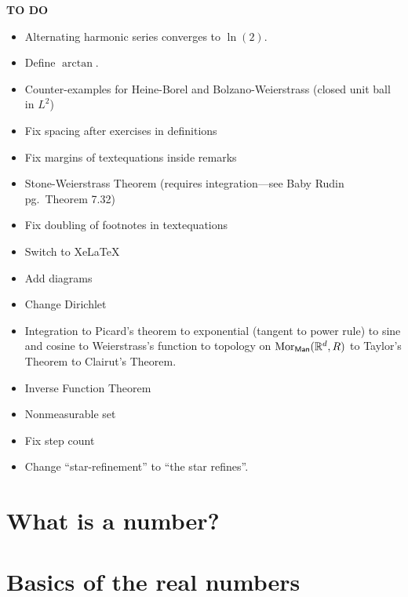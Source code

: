 \documentclass[11pt,fleqn]{book} %
\begin{document}
\textbf{TO DO}
\begin{itemize}
\item Alternating harmonic series converges to $\ln (2)$.

\item Define $\arctan$.

\item Counter-examples for Heine-Borel and Bolzano-Weierstrass (closed unit ball in $L^2$)

\item Fix spacing after exercises in definitions

\item Fix margins of textequations inside remarks

\item Stone-Weierstrass Theorem (requires integration---see Baby Rudin pg.~Theorem 7.32)

\item Fix doubling of footnotes in textequations

\item Switch to XeLaTeX

\item Add diagrams

\item Change Dirichlet

\item Integration to Picard's theorem to exponential (tangent to power rule) to sine and cosine to Weierstrass's function to topology on $\operatorname{Mor} _{\mathsf{Man}}(\mathbb{R} ^d,
R )$ to Taylor's Theorem to Clairut's Theorem.

\item Inverse Function Theorem

\item Nonmeasurable set

\item Fix step count

\item Change ``star-refinement'' to ``the star refines''. 
\end{itemize}



\chapter{What is a number?}\label{chp1}




\chapter{Basics of the real numbers}
\end{document}
